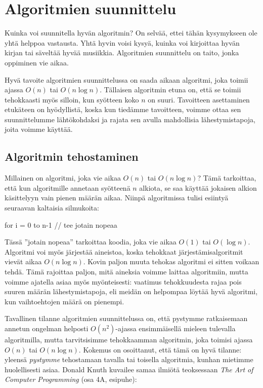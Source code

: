 \chapter{Algoritmien suunnittelu}

Kuinka voi suunnitella hyvän algoritmin?
On selvää, ettei tähän kysymykseen ole yhtä helppoa vastausta.
Yhtä hyvin voisi kysyä, kuinka voi kirjoittaa hyvän kirjan
tai säveltää hyvää musiikkia.
Algoritmien suunnittelu on taito, jonka oppiminen vie aikaa.

Hyvä tavoite algoritmien suunnittelussa on saada aikaan
algoritmi, joka toimii ajassa $O(n)$ tai $O(n \log n)$.
Tällaisen algoritmin etuna on, että se toimii tehokkaasti
myös silloin, kun syötteen koko $n$ on suuri.
Tavoitteen asettaminen etukäteen on hyödyllistä,
koska kun tiedämme tavoitteen, voimme ottaa sen suunnittelumme
lähtökohdaksi ja rajata sen avulla mahdollisia
lähestymistapoja, joita voimme käyttää.

\section{Algoritmin tehostaminen}

Millainen on algoritmi, joka vie aikaa $O(n)$ tai $O(n \log n)$?
Tämä tarkoittaa,
että kun algoritmille annetaan syötteenä $n$ alkiota,
se saa käyttää jokaisen alkion käsittelyyn
vain pienen määrän aikaa.
Niinpä algoritmissa tulisi esiintyä seuraavan kaltaisia silmukoita:

\begin{code}
for i = 0 to n-1
    // tee jotain nopeaa
\end{code}

Tässä ''jotain nopeaa'' tarkoittaa koodia, joka vie aikaa
$O(1)$ tai $O(\log n)$.
Algoritmi voi myös järjestää aineistoa,
koska tehokkaat järjestämisalgoritmit vievät aikaa $O(n \log n)$.
Kovin paljon muuta tehokas algoritmi ei sitten voikaan tehdä.
Tämä rajoittaa paljon, mitä aineksia voimme laittaa algoritmiin,
mutta voimme ajatella asiaa myös myönteisesti:
vaatimus tehokkuudesta rajaa pois suuren määrän lähestymistapoja,
eli meidän on helpompaa löytää hyvä algoritmi,
kun vaihtoehtojen määrä on pienempi.

Tavallinen tilanne algoritmien suunnittelussa on,
että pystymme ratkaisemaan annetun ongelman
helposti $O(n^2)$-ajassa ensimmäisellä mieleen tulevalla algoritmilla,
mutta tarvitsisimme tehokkaamman algoritmin,
joka toimisi ajassa $O(n)$ tai $O(n \log n)$.
Kokemus on osoittanut, että tämä on hyvä tilanne:
yleensä \emph{pystymme} tehostamaan
tavalla tai toisella algoritmia,
kunhan mietimme huolellisesti asiaa.
Donald Knuth kuvailee samaa ilmiötä teoksessaan
\emph{The Art of Computer Programming} (osa 4A, esipuhe):

